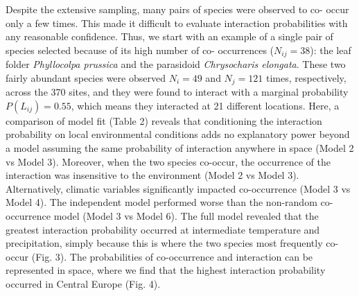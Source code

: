 \documentclass[12pt]{article}
\begin{document}
Despite the extensive sampling, many pairs of species were observed to co-
occur only a few times. This made it difficult to evaluate interaction
probabilities with any reasonable confidence. Thus, we start with an example
of a single pair of species selected because of its high number of co-
occurrences ($N_{ij}=38$): the leaf folder \textit{Phyllocolpa prussica} and
the parasidoid \textit{Chrysocharis elongata}. These two fairly abundant
species were observed $N_i=49$ and $N_j=121$ times, respectively, across the
370 sites, and they were found to interact with a marginal probability
$P(L_{ij})=0.55$, which means they interacted at 21 different locations. Here,
a comparison of model fit (Table 2) reveals that conditioning the interaction
probability on local environmental conditions adds no explanatory power beyond
a model assuming the same probability of interaction anywhere in space (Model
2 vs Model 3). Moreover, when the two species co-occur, the occurrence of the
interaction was insensitive to the environment (Model 2 vs Model 3).
Alternatively, climatic variables significantly impacted co-occurrence (Model
3 vs Model 4). The independent model performed worse than the non-random co-
occurrence model (Model 3 vs Model 6). The full model revealed that the
greatest interaction probability occurred at intermediate temperature and
precipitation, simply because this is where the two species most frequently
co-occur (Fig. 3). The probabilities of co-occurrence and interaction can be
represented in space, where we find that the highest interaction probability
occurred in Central Europe (Fig. 4).
\end{document}
